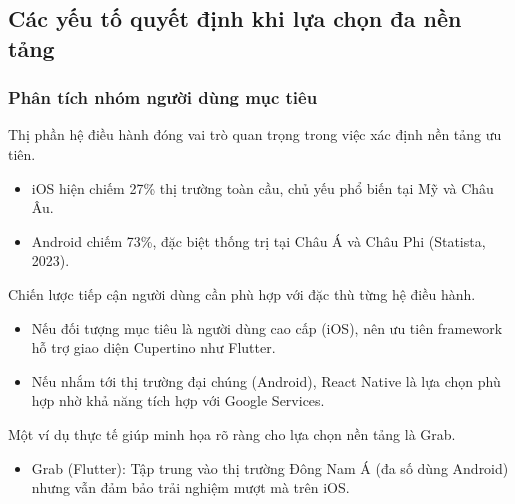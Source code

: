 \subsection{Các yếu tố quyết định khi lựa chọn đa nền tảng}
\renewcommand{\labelitemi}{--}    
\begin{flushleft}

  \subsubsection{Phân tích nhóm người dùng mục tiêu}
    \begin{flushleft}
      \hspace*{0.8cm}Thị phần hệ điều hành đóng vai trò quan trọng trong việc xác định nền tảng ưu tiên.
      \setlength{\leftmargini}{1.5cm}
      \begin{itemize}
        \item iOS hiện chiếm 27\% thị trường toàn cầu, chủ yếu phổ biến tại Mỹ và Châu Âu.
        \item Android chiếm 73\%, đặc biệt thống trị tại Châu Á và Châu Phi (Statista, 2023).
      \end{itemize}
    \end{flushleft}

    \begin{flushleft}
      \hspace*{0.8cm}Chiến lược tiếp cận người dùng cần phù hợp với đặc thù từng hệ điều hành.
      \setlength{\leftmargini}{1.5cm}
      \begin{itemize}
          \item Nếu đối tượng mục tiêu là người dùng cao cấp (iOS), nên ưu tiên framework hỗ trợ giao diện Cupertino như Flutter.
          \item Nếu nhắm tới thị trường đại chúng (Android), React Native là lựa chọn phù hợp nhờ khả năng tích hợp với Google Services.
      \end{itemize}
    \end{flushleft}

    \begin{flushleft}
      \hspace*{0.8cm}Một ví dụ thực tế giúp minh họa rõ ràng cho lựa chọn nền tảng là Grab.
      \setlength{\leftmargini}{1.5cm}
      \begin{itemize}
          \item Grab (Flutter): Tập trung vào thị trường Đông Nam Á (đa số dùng Android) nhưng vẫn đảm bảo trải nghiệm mượt mà trên iOS.
      \end{itemize}
    \end{flushleft}


\end{flushleft}
